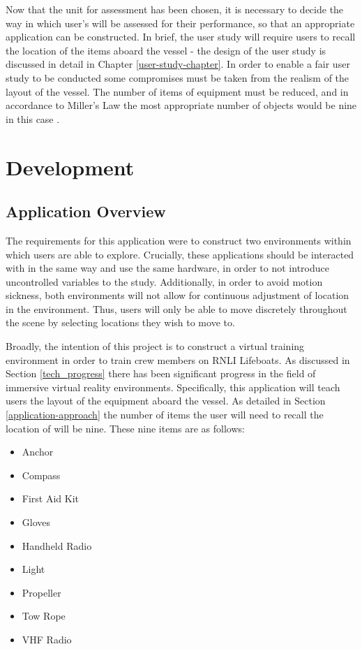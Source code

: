 \documentclass[ %
                    author={Elis Jones},
                supervisor={Dr. Kirsten Cater},
                    degree={BSc},
                     title={The Effect of Presentation Medium on Spatial Cognition},
                  subtitle={in the Virtual Environment},
                      year={2018} ]{dissertation}
\begin{document}
Now that the unit for assessment has been chosen, it is necessary to decide the way in which user's will be assessed for their performance, so that an appropriate application can be constructed. In brief, the user study will require users to recall the location of the items aboard the vessel - the design of the user study is discussed in detail in Chapter \ref{user-study-chapter}. In order to enable a fair user study to be conducted some compromises must be taken from the realism of the layout of the vessel. The number of items of equipment must be reduced, and in accordance to Miller's Law the most appropriate number of objects would be nine in this case \citep{Miller1956}. 

\chapter{Development}

\section{Application Overview}
The requirements for this application were to construct two environments within which users are able to explore. Crucially, these applications should be interacted with in the same way and use the same hardware, in order to not introduce uncontrolled variables to the study. Additionally, in order to avoid motion sickness, both environments will not allow for continuous adjustment of location in the environment. Thus, users will only be able to move discretely throughout the scene by selecting locations they wish to move to. 

Broadly, the intention of this project is to construct a virtual training environment in order to train crew members on RNLI Lifeboats. As discussed in Section \ref{tech_progress} there has been significant progress in the field of immersive virtual reality environments. Specifically, this application will teach users the layout of the equipment aboard the vessel. As detailed in Section \ref{application-approach} the number of items the user will need to recall the location of will be nine. These nine items are as follows:

\begin{itemize}
    \item Anchor
    \item Compass
    \item First Aid Kit
    \item Gloves
    \item Handheld Radio
    \item Light
    \item Propeller
    \item Tow Rope
    \item VHF Radio
\end{itemize}
\end{document}

